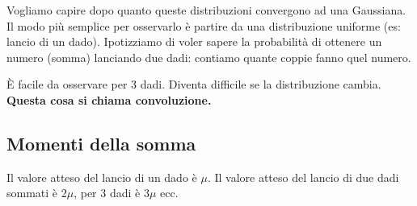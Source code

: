 Vogliamo capire dopo quanto queste distribuzioni convergono ad una Gaussiana. Il modo più semplice per osservarlo è partire da una distribuzione uniforme (es: lancio di un dado).
Ipotizziamo di voler sapere la probabilità di ottenere un numero (somma) lanciando due dadi: contiamo quante coppie fanno quel numero.

\begin{center}
\end{center}

È facile da osservare per 3 dadi. Diventa difficile se la distribuzione cambia. 
\textbf{Questa cosa si chiama convoluzione.}

\subsection{Momenti della somma}

Il valore atteso del lancio di un dado è $\mu$. Il valore atteso del lancio di due dadi sommati è $2\mu$, per 3 dadi è $3\mu$ ecc.

